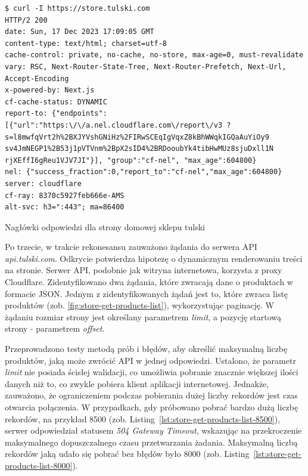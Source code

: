 \begin{listing}[H]
    \begin{verbatim}
$ curl -I https://store.tulski.com
HTTP/2 200
date: Sun, 17 Dec 2023 17:09:05 GMT
content-type: text/html; charset=utf-8
cache-control: private, no-cache, no-store, max-age=0, must-revalidate
vary: RSC, Next-Router-State-Tree, Next-Router-Prefetch, Next-Url, Accept-Encoding
x-powered-by: Next.js
cf-cache-status: DYNAMIC
report-to: {"endpoints":[{"url":"https:\/\/a.nel.cloudflare.com\/report\/v3 ?s=l8mwfqVrt2h%2BXJYVshGNiHz%2FIRwSCEqIgVqxZ8kBhWWqkIGQaAuYiOy9 sv4JmNEGP1%2B53j1pVTVnm%2BpX2sID4%2BRDooubYk4tibHwMUz8sjuDxll1N rjXEffI6gReu1VJV7JI"}], "group":"cf-nel", "max_age":604800}
nel: {"success_fraction":0,"report_to":"cf-nel","max_age":604800}
server: cloudflare
cf-ray: 8370c5927feb666e-AMS
alt-svc: h3=":443"; ma=86400
    \end{verbatim}
    \caption{Nagłówki odpowiedzi dla strony domowej sklepu tulski}
    \label{lst:rekonesans-get-homepage}
\end{listing}

Po trzecie, w trakcie rekonesansu zauważono żądania do serwera API \emph{api.tulski.com}.
Odkrycie potwierdza hipotezę o dynamicznym renderowaniu treści na stronie.
Serwer API, podobnie jak witryna internetowa, korzysta z proxy Cloudflare.
Zidentyfikowano dwa żądania, które zwracają dane o produktach w formacie JSON\@.
Jednym z zidentyfikowanych żądań jest to, które zwraca listę produktów (zob. \autoref{fig:store-get-products-list}), wykorzystując paginację.
W żądaniu rozmiar strony jest określany parametrem \emph{limit}, a pozycję startową strony - parametrem \emph{offset}.

Przeprowadzono testy metodą prób i błędów, aby określić maksymalną liczbę produktów, jaką może zwrócić API w jednej odpowiedzi.
Ustalono, że parametr \emph{limit} nie posiada ścisłej walidacji, co umożliwia pobranie znacznie większej ilości danych niż to, co zwykle pobiera klient aplikacji internetowej.
Jednakże, zauważono, że ograniczeniem podczas pobierania dużej liczby rekordów jest czas otwarcia połączenia.
W przypadkach, gdy próbowano pobrać bardzo dużą liczbę rekordów, na przykład 8500 (zob. Listing~\ref{lst:store-get-products-list-8500}), serwer odpowiedział statusem \emph{504 Gateway Timeout}, wskazując na przekroczenie maksymalnego dopuszczalnego czasu przetwarzania żadania.
Maksymalną liczbą rekordów jaką udało się pobrać bez błędów było 8000 (zob. Listing~\ref{lst:store-get-products-list-8000}).


